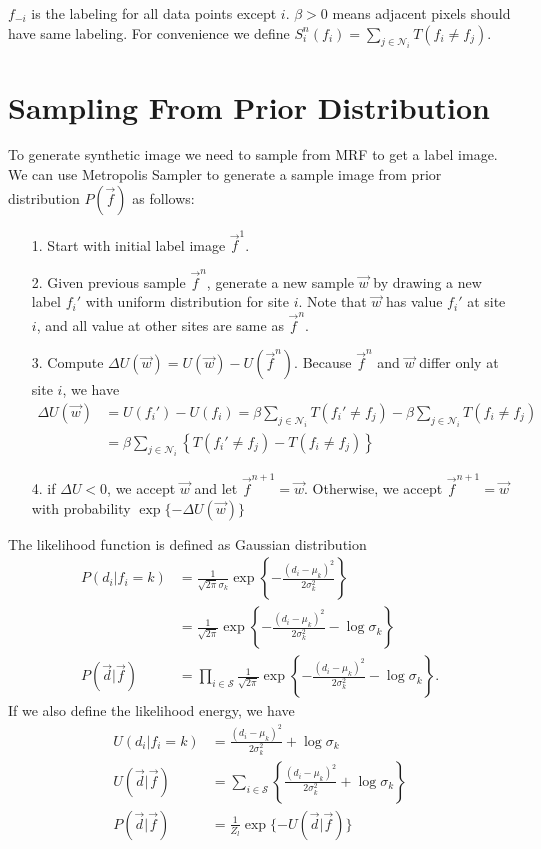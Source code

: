 \documentclass[12pt]{article}
\begin{document}
$f_{-i}$ is the labeling for all data points except $i$. $\beta > 0$ means adjacent pixels should have same labeling. For convenience we define $S_i^n (f_i) = \sum_{j\in \mathcal{N}_i} T(f_i \neq f_j) $.

\section{Sampling From Prior Distribution}

To generate synthetic image we need to sample from MRF to get a label image.  We can use Metropolis Sampler to generate a sample image from prior distribution $P(\vec f)$ as follows:
\begin{itemize}
  \item[1.] Start with initial label image $\vec f^1$.
  \item[2.] Given previous sample $\vec f^{n}$, generate a new sample $\vec w$ by drawing a new label  $f_i'$  with uniform distribution for site $i$. Note that $\vec w$ has value $f_i'$ at site $i$, and all value at other sites are same as $\vec f^{n}$. 
   \item[3.] Compute $\Delta U(\vec w) = U(\vec w) - U(\vec f^n)$. Because $\vec f^{n}$ and $\vec w$ differ only at site $i$, we have
     \begin{align*}
       \Delta U(\vec w) &= U(f_i') - U(f_i) = \beta \sum_{j\in \mathcal{N}_i} T(f_i' \neq f_j)- \beta \sum_{j\in \mathcal{N}_i} T(f_i \neq f_j) \\
       &= \beta \sum_{j \in \mathcal{N}_i} \left \{  T(f_i' \neq f_j) - T(f_i \neq f_j) \right \}
     \end{align*}
     \item[4.] if $\Delta U < 0$, we accept $\vec w$ and let $\vec f^{n+1} = \vec w$. Otherwise, we accept $\vec f^{n+1} = \vec w$ with probability $\exp \{ - \Delta U(\vec w)\}$
\end{itemize}

The likelihood function is defined as Gaussian distribution
\begin{align*}
  P(d_i | f_i = k) &= \frac{1}{\sqrt{2\pi} \sigma_k}\exp \left \{ -\frac{(d_i - \mu_k)^2}{2\sigma_k^2}\right \} \\
  &= \frac{1}{\sqrt{2\pi} }\exp \left \{ -\frac{(d_i - \mu_k)^2}{2\sigma_k^2} - 
\log \sigma_k \right \} \\
P(\vec d | \vec f) &= \prod_{i \in \mathcal{S}}\frac{1}{\sqrt{2\pi} }\exp \left \{ -\frac{(d_i - \mu_k)^2}{2\sigma_k^2} - \log \sigma_k \right \} .
\end{align*}
If we also define the likelihood energy, we have
\begin{align*}
  U(d_i | f_i = k) &= \frac{(d_i - \mu_k)^2}{2\sigma_k^2} + \log \sigma_k \\
  U(\vec d | \vec f) &= \sum_{i \in \mathcal{S}} \left \{\frac{(d_i - \mu_k)^2}{2\sigma_k^2} + \log \sigma_k \right \}\\
  P(\vec d | \vec f) &= \frac{1}{Z_l}\exp \{ -U(\vec d | \vec f)\}
\end{align*}
\end{document}
